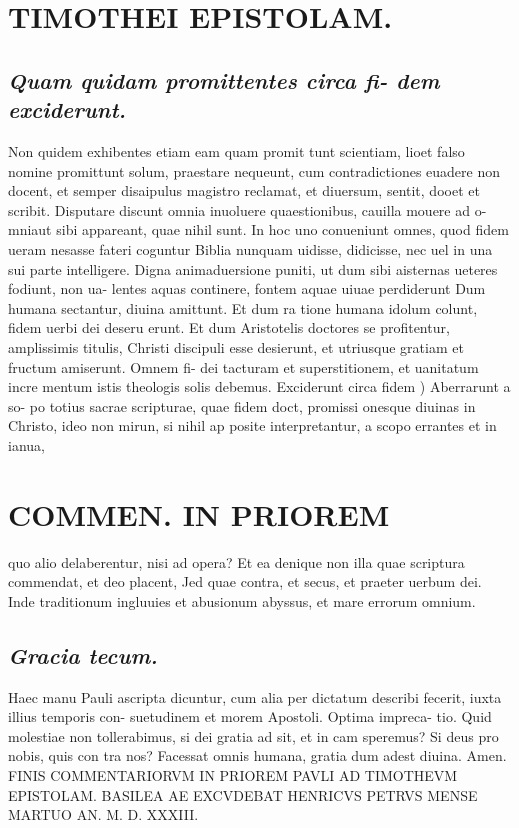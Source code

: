 \documentclass{article}
\begin{document}
\begin{pages}
\section*{TIMOTHEI EPISTOLAM. }
\marginpar{[ p.189 ]}
{}
\subsection*{\textit{Quam quidam promittentes circa fi- dem exciderunt. }}\pstart Non quidem exhibentes etiam eam quam promit tunt scientiam, lioet falso nomine promittunt solum, praestare nequeunt, cum contradictiones euadere non docent, et semper disaipulus magistro reclamat, et diuersum, sentit, dooet et scribit. Disputare discunt omnia inuoluere quaestionibus, cauilla mouere ad o- mniaut sibi appareant, quae nihil sunt. In hoc uno conueniunt omnes, quod fidem ueram nesasse fateri coguntur Biblia nunquam uidisse, didicisse, nec uel in una sui parte intelligere. Digna animaduersione puniti, ut dum sibi aisternas ueteres fodiunt, non ua- lentes aquas continere, fontem aquae uiuae perdiderunt Dum humana sectantur, diuina amittunt. Et dum ra tione humana idolum colunt, fidem uerbi dei deseru erunt. Et dum Aristotelis doctores se profitentur, amplissimis titulis, Christi discipuli esse desierunt, et utriusque gratiam et fructum amiserunt. Omnem fi- dei tacturam et superstitionem, et uanitatum incre mentum istis theologis solis debemus.  \pend\pstart Exciderunt circa fidem ) Aberrarunt a so- po totius sacrae scripturae, quae fidem doct, promissi onesque diuinas in Christo, ideo non mirun, si nihil ap posite interpretantur, a scopo errantes et in ianua,  \pend
\section*{COMMEN. IN PRIOREM }
\marginpar{[ p.190 ]}\pstart quo alio delaberentur, nisi ad opera? Et ea denique  non illa quae scriptura commendat, et deo placent, Jed quae contra, et secus, et praeter uerbum dei. Inde traditionum ingluuies et abusionum abyssus, et mare errorum omnium.  \pend
{}
{}
\subsection*{\textit{Gracia tecum. }}\pstart Haec manu Pauli ascripta dicuntur, cum alia per dictatum describi fecerit, iuxta illius temporis con- suetudinem et morem Apostoli. Optima impreca- tio. Quid molestiae non tollerabimus, si dei gratia ad sit, et in cam speremus? Si deus pro nobis, quis con tra nos? Facessat omnis humana, gratia dum adest diuina. Amen.  \pend\pstart FINIS COMMENTARIORVM IN PRIOREM PAVLI AD TIMOTHEVM EPISTOLAM.  \pend\pstart BASILEA AE EXCVDEBAT HENRICVS PETRVS MENSE MARTUO AN. M. D. XXXIII.  \pend
\endnumbering
\end{pages}
\end{document}
